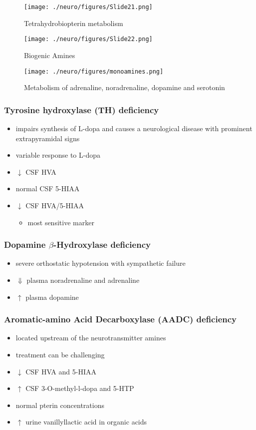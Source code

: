 \documentclass{scrartcl}
\begin{document}
\begin{figure}[htbp]
\centering
\texttt{[image: ./neuro/figures/Slide21.png]}
\caption{\label{fig:org25156f1}
Tetrahydrobiopterin metabolism}
\end{figure}

\begin{figure}[htbp]
\centering
\texttt{[image: ./neuro/figures/Slide22.png]}
\caption{\label{fig:org9dee810}
Biogenic Amines}
\end{figure}

\begin{figure}[htbp]
\centering
\texttt{[image: ./neuro/figures/monoamines.png]}
\caption{\label{fig:org2bb5bda}
Metabolism of adrenaline, noradrenaline, dopamine and serotonin}
\end{figure}


\subsubsection{Tyrosine hydroxylase (TH) deficiency}
\label{sec:orged9737f}
\begin{itemize}
\item impairs synthesis of L-dopa and causes a neurological disease with
prominent extrapyramidal signs
\item variable response to L-dopa
\item \(\downarrow\) CSF HVA
\item normal CSF 5-HIAA
\item \(\downarrow\) CSF HVA/5-HIAA
\begin{itemize}
\item most sensitive marker
\end{itemize}
\end{itemize}
\subsubsection{Dopamine \(\beta\)-Hydroxylase deficiency}
\label{sec:orgc46f0a4}
\begin{itemize}
\item severe orthostatic hypotension with sympathetic failure
\item \(\Downarrow\) plasma noradrenaline and adrenaline
\item \(\uparrow\) plasma dopamine
\end{itemize}
\subsubsection{Aromatic-amino Acid Decarboxylase (AADC) deficiency}
\label{sec:org8c224e3}
\begin{itemize}
\item located upstream of the neurotransmitter amines
\item treatment can be challenging
\item \(\downarrow\) CSF HVA and 5-HIAA
\item \(\uparrow\) CSF 3-O-methyl-l-dopa and 5-HTP
\item normal pterin concentrations
\item \(\uparrow\) urine vanillyllactic acid in organic acids
\end{itemize}
\end{document}

